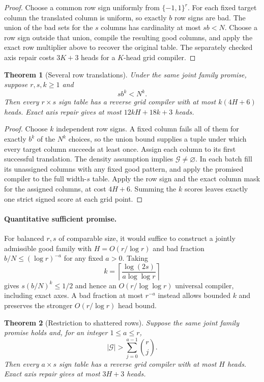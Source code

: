 \documentclass[11pt]{article}
\newtheorem{theorem}{Theorem}
\begin{document}
\begin{proof}
Choose a common row sign uniformly from $\{-1,1\}^r$. For each fixed
target column the translated column is uniform, so exactly $b$ row
signs are bad. The union of the bad sets for the $s$ columns has
cardinality at most $sb<N$. Choose a row sign outside that union,
compile the resulting good columns, and apply the exact row multiplier
above to recover the original table. The separately checked axis repair
costs $3K+3$ heads for a $K$-head grid compiler.
\end{proof}

\begin{theorem}[Several row translations]
Under the same joint family promise, suppose $r,s,k\geq1$ and
\[
 s b^k<N^k.
\]
Then every $r\times s$ sign table has a reverse grid compiler with
at most $k(4H+6)$ heads. Exact axis repair gives at most
$12kH+18k+3$ heads.
\end{theorem}

\begin{proof}
Choose $k$ independent row signs. A fixed column fails all of them for
exactly $b^k$ of the $N^k$ choices, so the union bound supplies a tuple
under which every target column succeeds at least once. Assign each
column to its first successful translation. The density assumption
implies $\mathcal G\neq\varnothing$. In each batch fill its unassigned
columns with any fixed good pattern, and apply the promised compiler
to the full width-$s$ table. Apply the row sign and the exact column
mask for the assigned columns, at cost $4H+6$. Summing the $k$ scores
leaves exactly one strict signed score at each grid point.
\end{proof}

\paragraph{Quantitative sufficient promise.}
For balanced $r,s$ of comparable size, it would suffice to construct a
jointly admissible good family with $H=O(r/\log r)$ and bad fraction
$b/N\leq(\log r)^{-a}$ for any fixed $a>0$. Taking
\[
 k=\left\lceil\frac{\log(2s)}{a\log\log r}\right\rceil
\]
gives $s(b/N)^k\leq1/2$ and hence an
$O(r/\log\log r)$ universal compiler, including exact axes.
A bad fraction at most $r^{-a}$ instead allows bounded $k$ and
preserves the stronger $O(r/\log r)$ head bound.

\begin{theorem}[Restriction to shattered rows]
Suppose the same joint family promise holds and, for an integer
$1\leq a\leq r$,
\[
 |\mathcal G|>\sum_{j=0}^{a-1}\binom rj.
\]
Then every $a\times s$ sign table has a reverse grid compiler with
at most $H$ heads. Exact axis repair gives at most $3H+3$ heads.
\end{theorem}
\end{document}

